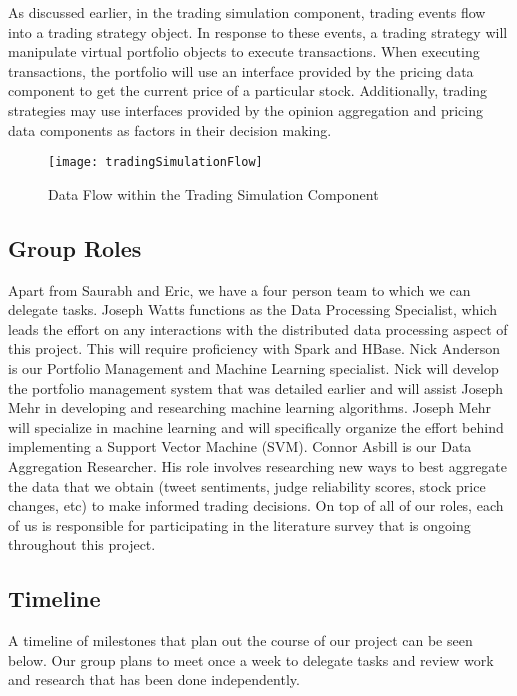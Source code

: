 As discussed earlier, in the trading simulation component, trading events flow into a trading strategy object. In response to these events, a trading strategy will manipulate virtual portfolio objects to execute transactions. When executing transactions, the portfolio will use an interface provided by the pricing data component to get the current price of a particular stock. Additionally, trading strategies may use interfaces provided by the opinion aggregation and pricing data components as factors in their decision making.

\begin{figure}[h]
  \label{tradingSimulationFlow}
  \begin{center}
    \texttt{[image: tradingSimulationFlow]}
  \end{center}
  \caption{Data Flow within the Trading Simulation Component}
\end{figure}

\subsection{Group Roles}

Apart from Saurabh and Eric, we have a four person team to which we can delegate tasks. Joseph Watts functions as the Data Processing Specialist, which leads the effort on any interactions with the distributed data processing aspect of this project. This will require proficiency with Spark and HBase. Nick Anderson is our Portfolio Management and Machine Learning specialist. Nick will develop the portfolio management system that was detailed earlier and will assist Joseph Mehr in developing and researching machine learning algorithms. Joseph Mehr will specialize in machine learning and will specifically organize the effort behind implementing a Support Vector Machine (SVM). Connor Asbill is our Data Aggregation Researcher. His role involves researching new ways to best aggregate the data that we obtain (tweet sentiments, judge reliability scores, stock price changes, etc) to make informed trading decisions. On top of all of our roles, each of us is responsible for participating in the literature survey that is ongoing throughout this project.

\subsection{Timeline}

A timeline of milestones that plan out the course of our project can be seen below. Our group plans to meet once a week to delegate tasks and review work and research that has been done independently.

